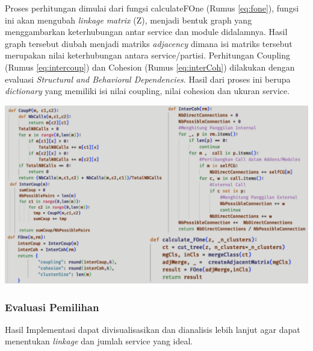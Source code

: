 Proses perhitungan dimulai dari fungsi calculateFOne (Rumus \ref{eq:fone}), fungsi ini akan mengubah \textit{linkage} \textit{matrix} (Z), menjadi bentuk graph yang menggambarkan keterhubungan antar service dan module didalamnya. Hasil graph tersebut diubah menjadi matriks \textit{adjacency} dimana isi matriks tersebut merupakan nilai keterhubungan antara service/partisi. Perhitungan Coupling (Rumus \ref{eq:intercoup}) dan Cohesion (Rumus \ref{eq:interCoh}) dilakukan dengan evaluasi \textit{Structural and Behavioral Dependencies}. 
Hasil dari proses ini berupa \textit{dictionary} yang memiliki isi nilai coupling, nilai cohesion dan ukuran service.

\begin{center}
	\includegraphics[width=14cm]{img/bab_4/coding_evaluasi.png}
	\label{fig:coding_evaluasi}
\end{center}


\subsubsection{Evaluasi Pemilihan}
Hasil Implementasi dapat divisualisasikan dan dianalisis lebih lanjut agar dapat menentukan \textit{linkage} dan jumlah service yang ideal. 


